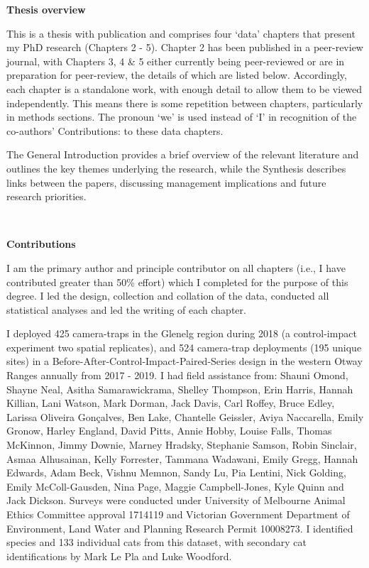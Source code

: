 \documentclass[11pt,a4paper,titlepage,twoside,openright]{style/unimelbthesis}
\begin{document}
\begin{frontmatter}
\begin{preface}
    \textbf{Thesis overview}
    
    This is a thesis with publication and comprises four `data' chapters that present my PhD research (Chapters 2 - 5). Chapter 2 has been published in a peer-review journal, with Chapters 3, 4 \& 5 either currently being peer-reviewed or are in preparation for peer-review, the details of which are listed below. Accordingly, each chapter is a standalone work, with enough detail to allow them to be viewed independently. This means there is some repetition between chapters, particularly in methods sections. The pronoun `we' is used instead of `I' in recognition of the co-authors' Contributions: to these data chapters.
    
    The General Introduction provides a brief overview of the relevant literature and outlines the key themes underlying the research, while the Synthesis describes links between the papers, discussing management implications and future research priorities.
    
    \(~\)
    
    \textbf{Contributions}
    
    I am the primary author and principle contributor on all chapters (i.e., I have contributed greater than 50\% effort) which I completed for the purpose of this degree. I led the design, collection and collation of the data, conducted all statistical analyses and led the writing of each chapter.
    
    I deployed 425 camera-traps in the Glenelg region during 2018 (a control-impact experiment two spatial replicates), and 524 camera-trap deployments (195 unique sites) in a Before-After-Control-Impact-Paired-Series design in the western Otway Ranges annually from 2017 - 2019. I had field assistance from: Shauni Omond, Shayne Neal, Asitha Samarawickrama, Shelley Thompson, Erin Harris, Hannah Killian, Lani Watson, Mark Dorman, Jack Davis, Carl Roffey, Bruce Edley, Larissa Oliveira Gonçalves, Ben Lake, Chantelle Geissler, Aviya Naccarella, Emily Gronow, Harley England, David Pitts, Annie Hobby, Louise Falls, Thomas McKinnon, Jimmy Downie, Marney Hradsky, Stephanie Samson, Robin Sinclair, Asmaa Alhusainan, Kelly Forrester, Tammana Wadawani, Emily Gregg, Hannah Edwards, Adam Beck, Vishnu Memnon, Sandy Lu, Pia Lentini, Nick Golding, Emily McColl-Gausden, Nina Page, Maggie Campbell-Jones, Kyle Quinn and Jack Dickson. Surveys were conducted under University of Melbourne Animal Ethics Committee approval 1714119 and Victorian Government Department of Environment, Land Water and Planning Research Permit 10008273. I identified species and 133 individual cats from this dataset, with secondary cat identifications by Mark Le Pla and Luke Woodford.
    

\end{preface}
\end{frontmatter}
\end{document}
